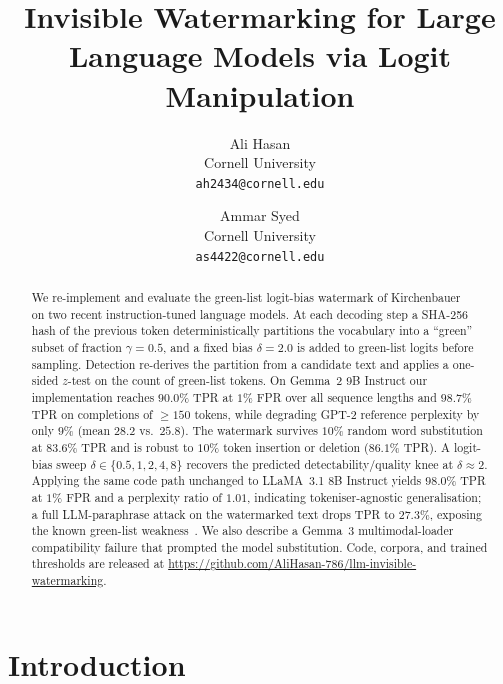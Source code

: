 \documentclass[10pt,twocolumn,letterpaper]{article}
\begin{document}
\title{Invisible Watermarking for Large Language Models via Logit Manipulation}

\author{Ali Hasan\\
Cornell University\\
{\tt\small ah2434@cornell.edu}
\and
Ammar Syed\\
Cornell University\\
{\tt\small as4422@cornell.edu}
}

\maketitle

\begin{abstract}
We re-implement and evaluate the green-list logit-bias watermark of Kirchenbauer~\etal~\cite{kirchenbauer2023} on two recent instruction-tuned language models. At each decoding step a SHA-256 hash of the previous token deterministically partitions the vocabulary into a ``green'' subset of fraction $\gamma{=}0.5$, and a fixed bias $\delta{=}2.0$ is added to green-list logits before sampling. Detection re-derives the partition from a candidate text and applies a one-sided $z$-test on the count of green-list tokens. On Gemma~2 9B Instruct our implementation reaches $90.0\%$ TPR at $1\%$ FPR over all sequence lengths and $98.7\%$ TPR on completions of $\geq\!150$ tokens, while degrading GPT-2 reference perplexity by only $9\%$ (mean $28.2$ vs.\ $25.8$). The watermark survives $10\%$ random word substitution at $83.6\%$ TPR and is robust to $10\%$ token insertion or deletion ($86.1\%$ TPR). A logit-bias sweep $\delta\!\in\!\{0.5,1,2,4,8\}$ recovers the predicted detectability/quality knee at $\delta\!\approx\!2$. Applying the same code path unchanged to LLaMA~3.1 8B Instruct yields $98.0\%$ TPR at $1\%$ FPR and a perplexity ratio of $1.01$, indicating tokeniser-agnostic generalisation; a full LLM-paraphrase attack on the watermarked text drops TPR to $27.3\%$, exposing the known green-list weakness~\cite{kirchenbauer2024reliability}. We also describe a Gemma~3 multimodal-loader compatibility failure that prompted the model substitution. Code, corpora, and trained thresholds are released at \url{https://github.com/AliHasan-786/llm-invisible-watermarking}.
\end{abstract}

\section{Introduction}
\label{sec:intro}
\end{document}
